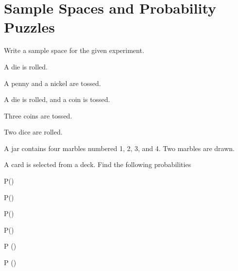 \section{Sample Spaces and Probability Puzzles}

Write a sample space for the given experiment.

\begin{puzzle}
    A die is rolled.
\end{puzzle}

\begin{puzzle}
    A penny and a nickel are tossed.
\end{puzzle}

\begin{puzzle}
    A die is rolled, and a coin is tossed.
\end{puzzle}

\begin{puzzle}
    Three coins are tossed.
\end{puzzle}

\begin{puzzle}
    Two dice are rolled.
\end{puzzle}

\begin{puzzle}
    A jar contains four marbles numbered 1, 2, 3, and 4. Two marbles are drawn.
\end{puzzle}


A card is selected from a deck. Find the following probabilities

\begin{puzzle}
    P()
\end{puzzle}

\begin{puzzle}
    P()
\end{puzzle}

\begin{puzzle}
    P()
\end{puzzle}

\begin{puzzle}
    P()
\end{puzzle}

\begin{puzzle}
    P ()
\end{puzzle}

\begin{puzzle}
    P ()
\end{puzzle}

